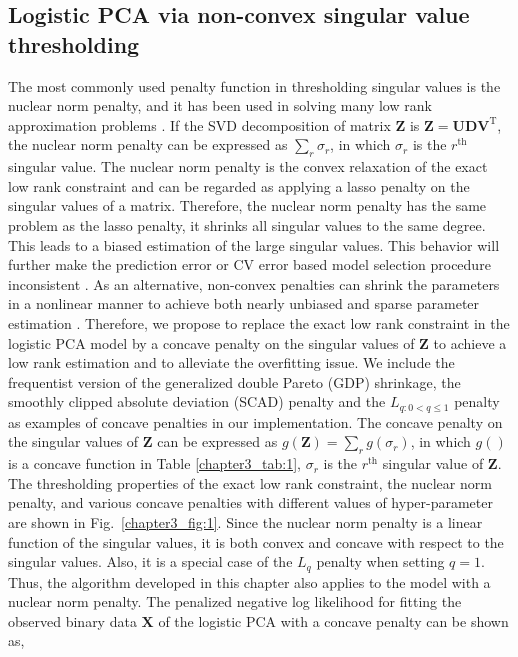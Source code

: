\subsection{Logistic PCA via non-convex singular value thresholding}
The most commonly used penalty function in thresholding singular values is the nuclear norm penalty, and it has been used in solving many low rank approximation problems \cite{candes2009exact,mazumder2010spectral,davenport20141,groenen2016multinomial}. If the SVD decomposition of matrix $\mathbf{Z}$ is $\mathbf{Z}=\mathbf{UDV}^{\text{T}}$, the nuclear norm penalty can be expressed as $\sum_{r} \sigma_r$, in which $\sigma_r$ is the $r^{\text{th}}$ singular value. The nuclear norm penalty is the convex relaxation of the exact low rank constraint and can be regarded as applying a lasso penalty on the singular values of a matrix. Therefore, the nuclear norm penalty has the same problem as the lasso penalty, it shrinks all singular values to the same degree. This leads to a biased estimation of the large singular values. This behavior will further make the prediction error or CV error based model selection procedure inconsistent \cite{meinshausen2010stability}. As an alternative, non-convex penalties can shrink the parameters in a nonlinear manner to achieve both nearly unbiased and sparse parameter estimation \cite{fan2001variable,armagan2013generalized}. Therefore, we propose to replace the exact low rank constraint in the logistic PCA model by a concave penalty on the singular values of $\mathbf{Z}$ to achieve a low rank estimation and to alleviate the overfitting issue. We include the frequentist version of the generalized double Pareto (GDP) \cite{armagan2013generalized} shrinkage, the smoothly clipped absolute deviation (SCAD) penalty \cite{fan2001variable} and the $L_{q:0<q \leq 1}$ penalty \cite{fu1998penalized} as examples of concave penalties in our implementation. The concave penalty on the singular values of $\mathbf{Z}$ can be expressed as $g(\mathbf{Z}) = \sum_{r} g(\sigma_r)$, in which $g()$ is a concave function in Table \ref{chapter3_tab:1}, $\sigma_{r}$ is the $r^{\text{th}}$ singular value of $\mathbf{Z}$. The thresholding properties of the exact low rank constraint, the nuclear norm penalty, and various concave penalties with different values of hyper-parameter are shown in Fig.~\ref{chapter3_fig:1}. Since the nuclear norm penalty is a linear function of the singular values, it is both convex and concave with respect to the singular values. Also, it is a special case of the $L_q$ penalty when setting $q=1$. Thus, the algorithm developed in this chapter also applies to the model with a nuclear norm penalty. The penalized negative log likelihood for fitting the observed binary data $\mathbf{X}$ of the logistic PCA with a concave penalty can be shown as,
